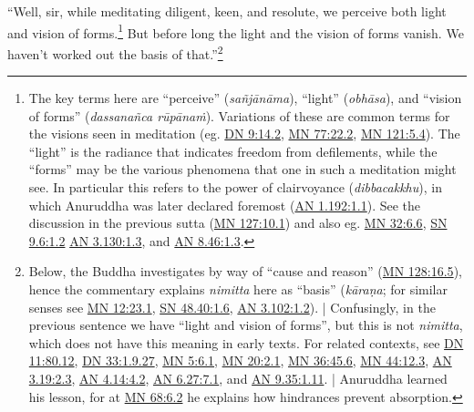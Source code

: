 \documentclass[12pt,openany]{book}%
\begin{document}
“Well, sir, while meditating diligent, keen, and resolute, we perceive both light and vision of forms.\footnote{The key terms here are “perceive” (\textit{\textsanskrit{sañjānāma}}), “light” (\textit{\textsanskrit{obhāsa}}), and “vision of forms” (\textit{\textsanskrit{dassanañca} \textsanskrit{rūpānaṁ}}). Variations of these are common terms for the visions seen in meditation (eg. \href{https://suttacentral.net/dn9/en/sujato\#14.2}{DN 9:14.2}, \href{https://suttacentral.net/mn77/en/sujato\#22.2}{MN 77:22.2}, \href{https://suttacentral.net/mn121/en/sujato\#5.4}{MN 121:5.4}). The “light” is the radiance that indicates freedom from defilements, while the “forms” may be the various phenomena that one in such a meditation might see. In particular this refers to the power of clairvoyance (\textit{dibbacakkhu}), in which Anuruddha was later declared foremost (\href{https://suttacentral.net/an1.192/en/sujato\#1.1}{AN 1.192:1.1}). See the discussion in the previous sutta (\href{https://suttacentral.net/mn127/en/sujato\#10.1}{MN 127:10.1}) and also eg. \href{https://suttacentral.net/mn32/en/sujato\#6.6}{MN 32:6.6}, \href{https://suttacentral.net/sn9.6/en/sujato\#1.2}{SN 9.6:1.2} \href{https://suttacentral.net/an3.130/en/sujato\#1.3}{AN 3.130:1.3}, and \href{https://suttacentral.net/an8.46/en/sujato\#1.3}{AN 8.46:1.3}. } But before long the light and the vision of forms vanish. We haven’t worked out the basis of that.”\footnote{Below, the Buddha investigates by way of “cause and reason” (\href{https://suttacentral.net/mn128/en/sujato\#16.5}{MN 128:16.5}), hence the commentary explains \textit{nimitta} here as “basis” (\textit{\textsanskrit{kāraṇa}}; for similar senses see \href{https://suttacentral.net/mn12/en/sujato\#23.1}{MN 12:23.1}, \href{https://suttacentral.net/sn48.40/en/sujato\#1.6}{SN 48.40:1.6}, \href{https://suttacentral.net/an3.102/en/sujato\#1.2}{AN 3.102:1.2}). | Confusingly, in the previous sentence we have “light and vision of forms”, but this is not \textit{nimitta}, which does not have this meaning in early texts. For related contexts, see \href{https://suttacentral.net/dn11/en/sujato\#80.12}{DN 11:80.12}, \href{https://suttacentral.net/dn33/en/sujato\#1.9.27}{DN 33:1.9.27}, \href{https://suttacentral.net/mn5/en/sujato\#6.1}{MN 5:6.1}, \href{https://suttacentral.net/mn20/en/sujato\#2.1}{MN 20:2.1}, \href{https://suttacentral.net/mn36/en/sujato\#45.6}{MN 36:45.6}, \href{https://suttacentral.net/mn44/en/sujato\#12.3}{MN 44:12.3}, \href{https://suttacentral.net/an3.19/en/sujato\#2.3}{AN 3.19:2.3}, \href{https://suttacentral.net/an4.14/en/sujato\#4.2}{AN 4.14:4.2}, \href{https://suttacentral.net/an6.27/en/sujato\#7.1}{AN 6.27:7.1}, and \href{https://suttacentral.net/an9.35/en/sujato\#1.11}{AN 9.35:1.11}. | Anuruddha learned his lesson, for at \href{https://suttacentral.net/mn68/en/sujato\#6.2}{MN 68:6.2} he explains how hindrances prevent absorption. } 
\end{document}
